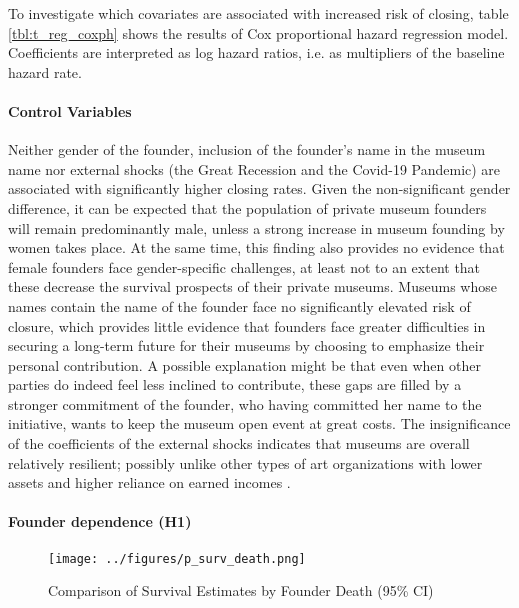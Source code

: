 \documentclass[12pt]{article}
\begin{document}
To investigate which covariates are associated with increased risk of closing, table \ref{tbl:t_reg_coxph} shows the results of Cox proportional hazard regression model.
Coefficients are interpreted as log hazard ratios, i.e. as multipliers of the baseline hazard rate.
\paragraph*{Control Variables}


Neither gender of the founder, inclusion of the founder's name in the museum name nor external shocks (the Great Recession and the Covid-19 Pandemic) are associated with significantly higher closing rates.
Given the non-significant gender difference, it can be expected that the population of private museum founders will remain predominantly male, unless a strong increase in museum founding by women takes place.
At the same time, this finding also provides no evidence that female founders face gender-specific challenges, at least not to an extent that these decrease the survival prospects of their private museums.
Museums whose names contain the name of the founder face no significantly elevated risk of closure, which provides little evidence that founders face greater difficulties in securing a long-term future for their museums by choosing to emphasize their personal contribution.
A possible explanation might be that even when other parties do indeed feel less inclined to contribute, these gaps are filled by a stronger commitment of the founder, who having committed her name to the initiative, wants to keep the museum open event at great costs.
The insignificance of the coefficients of the external shocks indicates that museums are overall relatively resilient; possibly unlike other types of art organizations with lower assets and higher reliance on earned incomes \parencite[p.102]{Bowen_etal_1994_charitable}.  
\paragraph*{Founder dependence (H1)}





\begin{figure}[htbp]
\centering
\texttt{[image: ../figures/p\_surv\_death.png]}
\caption{\label{fig:p_surv_death}Comparison of Survival Estimates by Founder Death (95\% CI)}
\end{figure}
\end{document}
